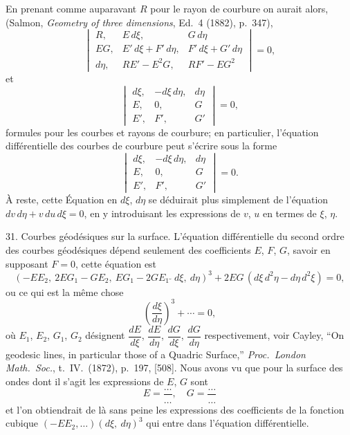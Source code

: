 \documentclass[11pt,a4paper]{book}
\begin{document}
En prenant comme auparavant $R$ pour le rayon de courbure on aurait alors,
(Salmon, \textit{Geometry of three dimensions}, Ed.\ 4 (1882), p.\ 347),
\[
\begin{vmatrix}
R, & E\,d\xi, & G\,d\eta \\
EG, & E'\,d\xi + F'\,d\eta, & F'\,d\xi + G'\,d\eta \\
d\eta, & RE' - E^2G, & RF' - EG^2
\end{vmatrix}
= 0,
\]
et
\[
\begin{vmatrix}
d\xi, & -d\xi\,d\eta, & d\eta \\
E, & 0, & G \\
E', & F', & G'
\end{vmatrix}
= 0,
\]
formules pour les courbes et rayons de courbure; en particulier, l'\'equation diff\'erentielle
des courbes de courbure peut s'\'ecrire sous la forme
\[
\begin{vmatrix}
d\xi, & -d\xi\,d\eta, & d\eta \\
E, & 0, & G \\
E', & F', & G'
\end{vmatrix}
= 0.
\]
\`A reste, cette \'Equation en $d\xi$, $d\eta$ se d\'eduirait plus simplement de l'\'equation
$dv\,d\eta + v\,du\,d\xi = 0$, en y introduisant les expressions de $v$, $u$ en termes de $\xi$, $\eta$.

31. Courbes g\'eod\'esiques sur la surface. L'\'equation diff\'erentielle du second ordre
des courbes g\'eod\'esiques d\'epend seulement des coefficients $E$, $F$, $G$, savoir en supposant
$F=0$, cette \'equation est
\[
(-EE_2,\ 2EG_1 - GE_2,\ EG_1 - 2GE_1\,\breve{\,}\,d\xi,\ d\eta)^3
+ 2EG\,(d\xi\,d^2\eta - d\eta\,d^2\xi) = 0,
\]
ou ce qui est la m\^eme chose
\[
\left(\frac{d\xi}{d\eta}\right)^3 + \cdots = 0,
\]
o\`u $E_1$, $E_2$, $G_1$, $G_2$ d\'esignent $\dfrac{dE}{d\xi}$, $\dfrac{dE}{d\eta}$,
$\dfrac{dG}{d\xi}$, $\dfrac{dG}{d\eta}$ respectivement,
voir Cayley, ``On geodesic lines, in particular those of a Quadric Surface,''
\textit{Proc.\ London Math.\ Soc.}, t.\ IV.\ (1872), p.\ 197, [508].
Nous avons vu que pour la surface des ondes dont il s'agit les expressions de $E$, $G$ sont
\[
E = \frac{\ldots}{\ldots}, \quad G = \frac{\ldots}{\ldots}
\]
et l'on obtiendrait de l\`a sans peine les expressions des coefficients de la fonction
cubique $(-EE_2,\ldots)(d\xi,\ d\eta)^3$ qui entre dans l'\'equation diff\'erentielle.

\newpage
\end{document}
